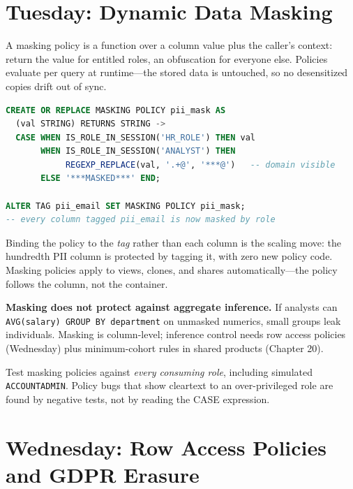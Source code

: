 \section{Tuesday: Dynamic Data Masking}
A masking policy is a function over a column value plus the caller's context: return the value for entitled roles, an obfuscation for everyone else. Policies evaluate per query at runtime---the stored data is untouched, so no desensitized copies drift out of sync.

\begin{lstlisting}[language=SQL, caption={A role-aware masking policy, bound to a tag}]
CREATE OR REPLACE MASKING POLICY pii_mask AS
  (val STRING) RETURNS STRING ->
  CASE WHEN IS_ROLE_IN_SESSION('HR_ROLE') THEN val
       WHEN IS_ROLE_IN_SESSION('ANALYST') THEN
            REGEXP_REPLACE(val, '.+@', '***@')   -- domain visible
       ELSE '***MASKED***' END;

ALTER TAG pii_email SET MASKING POLICY pii_mask;
-- every column tagged pii_email is now masked by role
\end{lstlisting}

Binding the policy to the \emph{tag} rather than each column is the scaling move: the hundredth PII column is protected by tagging it, with zero new policy code. Masking policies apply to views, clones, and shares automatically---the policy follows the column, not the container.

\begin{pitfall}
\textbf{Masking does not protect against aggregate inference.} If analysts can \texttt{AVG(salary) GROUP BY department} on unmasked numerics, small groups leak individuals. Masking is column-level; inference control needs row access policies (Wednesday) plus minimum-cohort rules in shared products (Chapter 20).
\end{pitfall}

\begin{notebox}
Test masking policies against \emph{every consuming role}, including simulated \texttt{ACCOUNTADMIN}. Policy bugs that show cleartext to an over-privileged role are found by negative tests, not by reading the CASE expression.
\end{notebox}

\section{Wednesday: Row Access Policies and GDPR Erasure}
